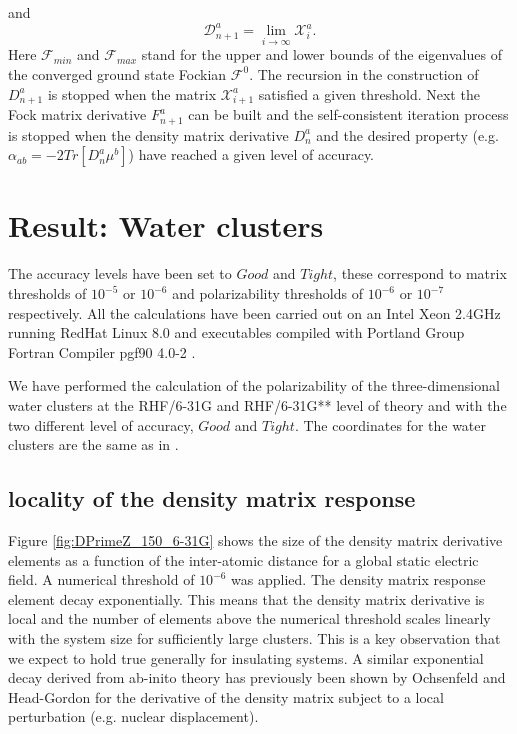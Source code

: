 \documentclass[twocolumn,showpacs,preprintnumbers,amsmath,amssymb]{revtex4}
\begin{document}
 and
 \begin{equation}
  \mathcal{D}^a_{n+1}=\lim_{i\to\infty}\mathcal{X}^a_{i}.
 \end{equation}
 Here $\mathcal{F}_{min}$ and $\mathcal{F}_{max}$ stand
 for the upper and lower bounds of the eigenvalues
 of the converged ground state Fockian $\mathcal{F}^0$.
 The recursion in the construction of $D^a_{n+1}$ 
 is stopped when the matrix $\mathcal{X}^a_{i+1} $
 satisfied a given threshold.
 Next the Fock matrix derivative $F^a_{n+1}$ can be 
 built and the self-consistent iteration process
 is stopped when the density matrix derivative
 $D^a_n$ and the  desired property 
 (e.g. $\alpha_{ab}=-2Tr[D^a_n\mu^b]$)
 have reached a given level of accuracy.

\section{Result: Water clusters}

 The accuracy levels have been set to $Good$ and $Tight$,
 these correspond to matrix thresholds of $10^{-5}$ or $10^{-6}$ 
 and polarizability thresholds of $10^{-6}$ or $10^{-7}$
 respectively.
 All the calculations have been carried out on
 an Intel Xeon 2.4GHz running RedHat Linux 8.0 and 
 executables compiled with Portland Group Fortran
 Compiler pgf90 4.0-2 \cite{PGF90}.

 We have performed the calculation of the polarizability of the
 three-dimensional water clusters at the RHF/6-31G and 
 RHF/6-31G** level of theory and with the two different level of 
 accuracy, $Good$ and $Tight$. The coordinates for the water
 clusters are the same as in \cite{Water}.


\subsection{locality of the density matrix response}
 Figure \ref{fig:DPrimeZ_150_6-31G} shows the size of 
 the density matrix derivative elements as a function
 of the inter-atomic distance for a global static
 electric field. A numerical threshold  of $10^{-6}$
 was applied. The density matrix response element decay
 exponentially. This means that the density matrix derivative
 is local and the number of elements above the 
 numerical threshold scales linearly with the system size
 for sufficiently large clusters. This is a key observation
 that we expect to hold true generally for insulating systems.
 A similar exponential decay derived from ab-inito theory
 has previously been shown by Ochsenfeld and
 Head-Gordon \cite{Ochsenfeld_1997}
 for the derivative of the density matrix subject to a
 local perturbation (e.g. nuclear displacement).
\end{document}
